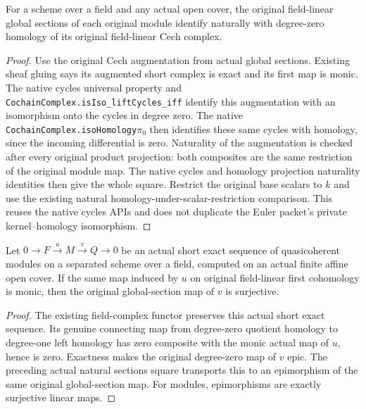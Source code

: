 \begin{lemma}
\label{lem:seshadri-original-sections-cech-zero-natural}
For a scheme over a field and any actual open cover, the original
field-linear global sections of each original module identify naturally
with degree-zero homology of its original field-linear Cech complex.
\end{lemma}
\begin{proof}
Use the original Cech augmentation from actual global sections. Existing
sheaf gluing says its augmented short complex is exact and its first map
is monic. The native cycles universal property and
\nolinkurl{CochainComplex.isIso_liftCycles_iff} identify this augmentation
with an isomorphism onto the cycles in degree zero. The native
\texttt{CochainComplex.isoHomology}\ensuremath{\pi_0} then identifies these
same cycles with homology, since the incoming differential is zero.
Naturality of the augmentation is checked after every original product
projection: both composites are the same restriction of the original
module map. The native cycles and homology projection naturality identities
then give the whole square. Restrict the original base scalars to $k$ and
use the existing natural homology-under-scalar-restriction comparison.
This reuses the native cycles APIs and does not duplicate the Euler
packet's private kernel--homology isomorphism.
\end{proof}

\begin{lemma}
\label{lem:seshadri-actual-hone-mono-sections-onto}
\leanok
Let $0\to F\xrightarrow{u}M\xrightarrow{v}Q\to0$ be an actual short exact
sequence of quasicoherent modules on a separated scheme over a field,
computed on an actual finite affine open cover. If the same map induced
by $u$ on original field-linear first cohomology is monic, then the
original global-section map of $v$ is surjective.
\end{lemma}
\begin{proof}
The existing field-complex functor preserves this actual short exact
sequence. Its genuine connecting map from degree-zero quotient homology
to degree-one left homology has zero composite with the monic actual
map of $u$, hence is zero. Exactness makes the original degree-zero map
of $v$ epic. The preceding actual natural sections square transports this
to an epimorphism of the same original global-section map. For modules,
epimorphisms are exactly surjective linear maps.
\end{proof}

